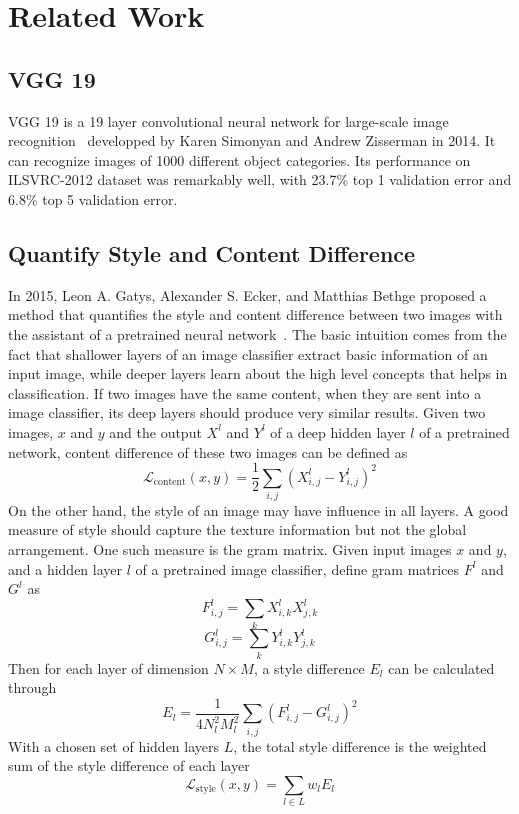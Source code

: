 \documentclass[10pt,twocolumn,letterpaper]{article}
\begin{document}

\section{Related Work}

\subsection{VGG 19}
VGG 19 is a 19 layer convolutional neural network for large-scale image recognition~\cite{Simonyan} developped by Karen Simonyan and Andrew Zisserman in 2014. It can recognize images of 1000 different object categories. Its performance on ILSVRC-2012 dataset was remarkably well, with 23.7\% top 1 validation error and 6.8\% top 5 validation error. 

\subsection{Quantify Style and Content Difference}
In 2015, Leon A. Gatys, Alexander S. Ecker, and Matthias Bethge proposed a method that quantifies the style and content difference between two images with the assistant of a pretrained neural network~\cite{Gatys}. The basic intuition comes from the fact that shallower layers of an image classifier extract basic information of an input image, while deeper layers learn about the high level concepts that helps in classification. If two images have the same content, when they are sent into a image classifier, its deep layers should produce very similar results. Given two images, $x$ and $y$ and the output $X^l$ and $Y^l$ of a deep hidden layer $l$ of a pretrained network, content difference of these two images can be defined as
$$\mathcal{L}_{\text{content}}(x,y)=\frac{1}{2}\sum_{i,j}(X^l_{i,j}-Y^l_{i,j})^2$$
On the other hand, the style of an image may have influence in all layers. A good measure of style should capture the texture information but not the global arrangement. One such measure is the gram matrix. Given input images $x$ and $y$, and a hidden layer $l$ of a pretrained image classifier, define gram matrices $F^l$ and $G^l$ as
$$F^l_{i,j}=\sum_{k}X^l_{i,k}X^l_{j,k}$$
$$G^l_{i,j}=\sum_{k}Y^l_{i,k}Y^l_{j,k}$$
Then for each layer of dimension $N\times M$, a style difference $E_l$ can be calculated through
$$E_l=\frac{1}{4N^2_lM^2_l}\sum_{i,j}(F^l_{i,j}-G^l_{i,j})^2$$
With a chosen set of hidden layers $L$, the total style difference is the weighted sum of the style difference of each layer
$$\mathcal{L}_{\text{style}}(x,y)=\sum_{l\in L}w_lE_l$$
\end{document}
